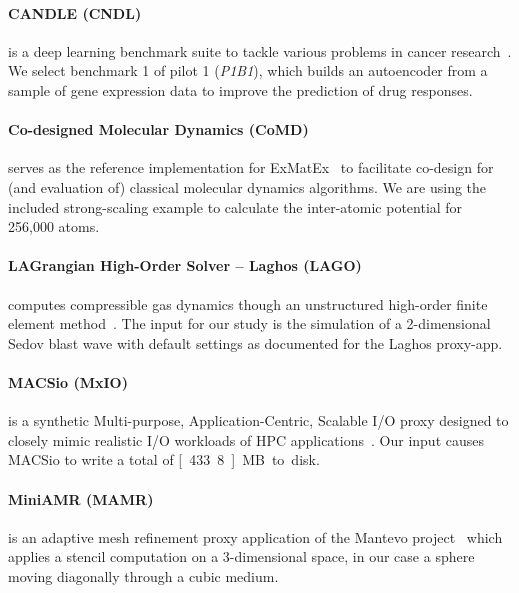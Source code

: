 \paragraph{CANDLE (CNDL)} is a deep learning benchmark suite to tackle various problems in cancer
research~\cite{wozniak_candle/supervisor:_2018}.
We select benchmark 1 of pilot 1 (\textit{P1B1}), which builds an autoencoder from a sample of gene
expression data to improve the prediction of drug responses.

\paragraph{Co-designed Molecular Dynamics (CoMD)} serves as the reference implementation for
ExMatEx~\cite{mohd-yusof_co-design_2013} to facilitate co-design for (and evaluation of) classical molecular
dynamics algorithms.
We are using the included strong-scaling example to calculate the inter-atomic potential for 256,000 atoms.

\paragraph{LAGrangian High-Order Solver -- Laghos (LAGO)} computes compressible gas dynamics though
an unstructured high-order finite element method~\cite{dobrev_high-order_2012}. The input for our study is the
simulation of a 2-dimensional Sedov blast wave with default settings as documented for the
Laghos proxy-app.

\paragraph{MACSio (MxIO)} is a synthetic Multi-purpose, Application-Centric,
Scalable I/O proxy designed to closely mimic realistic I/O workloads of
HPC applications~\cite{dickson_replicating_2016}. Our input causes MACSio to write a total of \unit[433.8]{MB} to disk.

\paragraph{MiniAMR (MAMR)} is an adaptive mesh refinement proxy application of the Mantevo
project~\cite{heroux_improving_2009} which applies a stencil computation on a 3-dimensional space,
in our case a sphere moving diagonally through a cubic medium.

